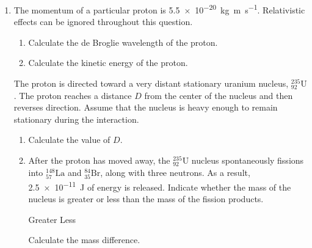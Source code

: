 \documentclass{../../../oss-apphys}
\begin{document}
\begin{enumerate}[leftmargin=15pt]
\item The momentum of a particular proton is
  \SI{5.5e-20}{\kilo\gram\metre\per\second}. Relativistic effects can be
  ignored throughout this question.
  \begin{enumerate}[leftmargin=18pt]
  \item Calculate the de Broglie wavelength of the proton.
  \item Calculate the kinetic energy of the proton.
  \end{enumerate}
  The proton is directed toward a very distant stationary uranium nucleus,
  $^{235}_{92}\text{U}$. The proton reaches a distance $D$ from the center of the
  nucleus and then reverses direction. Assume that the nucleus is heavy enough
  to remain stationary during the interaction.
  \begin{enumerate}[leftmargin=18pt,resume]
  \item Calculate the value of $D$.
  \item After the proton has moved away, the $^{235}_{92}\text{U}$ nucleus
    spontaneously fissions into $^{148}_{57}\text{La}$ and $^{84}_{35}\text{Br}$,
    along  with three neutrons. As a result, \SI{2.5e-11}{\joule} of energy is
    released. Indicate whether the mass of the nucleus is greater or less than
    the mass of the fission products.

    \vspace{.1in}
    \underline{\hspace{.3in}} Greater\hspace{.2in}
    \underline{\hspace{.3in}} Less
    
    \vspace{.1in}Calculate the mass difference.
  \end{enumerate}
  \newpage
  

\end{enumerate}
\end{document}
